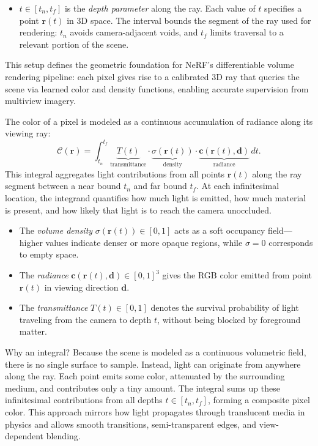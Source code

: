 \begin{itemize}
    \item \( t \in [t_n, t_f] \) is the \emph{depth parameter} along the ray. Each value of \( t \) specifies a point \( \mathbf{r}(t) \) in 3D space. The interval bounds the segment of the ray used for rendering: \( t_n \) avoids camera-adjacent voids, and \( t_f \) limits traversal to a relevant portion of the scene.
\end{itemize}

\noindent
This setup defines the geometric foundation for NeRF’s differentiable volume rendering pipeline: each pixel gives rise to a calibrated 3D ray that queries the scene via learned color and density functions, enabling accurate supervision from multiview imagery.

\medskip

\noindent
The color of a pixel is modeled as a continuous accumulation of radiance along its viewing ray:
\[
\mathcal{C}(\mathbf{r}) =
\int_{t_n}^{t_f}
\underbrace{T(t)}_{\text{transmittance}}
\cdot
\underbrace{\sigma(\mathbf{r}(t))}_{\text{density}}
\cdot
\underbrace{\mathbf{c}(\mathbf{r}(t), \mathbf{d})}_{\text{radiance}}
\, dt.
\]
This integral aggregates light contributions from all points \( \mathbf{r}(t) \) along the ray segment between a near bound \( t_n \) and far bound \( t_f \). At each infinitesimal location, the integrand quantifies how much light is emitted, how much material is present, and how likely that light is to reach the camera unoccluded.

\begin{itemize}
    \item The \emph{volume density} \( \sigma(\mathbf{r}(t)) \in [0,1] \) acts as a soft occupancy field—higher values indicate denser or more opaque regions, while \( \sigma = 0 \) corresponds to empty space.
    \item The \emph{radiance} \( \mathbf{c}(\mathbf{r}(t), \mathbf{d}) \in [0,1]^3 \) gives the RGB color emitted from point \( \mathbf{r}(t) \) in viewing direction \( \mathbf{d} \).
    \item The \emph{transmittance} \( T(t) \in [0,1] \) denotes the survival probability of light traveling from the camera to depth \( t \), without being blocked by foreground matter.
\end{itemize}

\noindent
Why an integral? Because the scene is modeled as a continuous volumetric field, there is no single surface to sample. Instead, light can originate from anywhere along the ray. Each point emits some color, attenuated by the surrounding medium, and contributes only a tiny amount. The integral sums up these infinitesimal contributions from all depths \( t \in [t_n, t_f] \), forming a composite pixel color. This approach mirrors how light propagates through translucent media in physics and allows smooth transitions, semi-transparent edges, and view-dependent blending.

